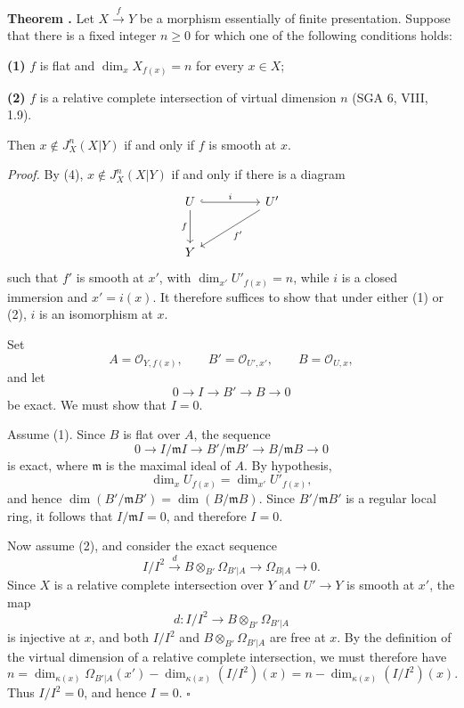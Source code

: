 \medskip
\noindent\textbf{Theorem .}
Let $X\xrightarrow{f}Y$ be a morphism essentially of finite
presentation. Suppose that there is a fixed integer $n\geq0$ for
which one of the following conditions holds:

\smallskip
\noindent\textbf{(1)} $f$ is flat and
$\dim_xX_{f(x)}=n$ for every $x\in X$;

\smallskip
\noindent\textbf{(2)} $f$ is a relative complete intersection of
virtual dimension $n$ (SGA 6, VIII, 1.9).

\smallskip
Then $x\notin J_X^n(X|Y)$ if and only if $f$ is smooth at $x$.

\smallskip
\noindent\textit{Proof.}
By (4), $x\notin J_X^n(X|Y)$ if and only if there is a diagram
\[
\begin{tikzcd}[column sep=huge,row sep=large]
U \arrow[r,hook,"i"] \arrow[d,"f"']
  & U' \arrow[dl,"f'"] \\
Y & {}
\end{tikzcd}
\]
such that $f'$ is smooth at $x'$, with
$\dim_{x'}U'_{f(x)}=n$, while $i$ is a closed immersion and
$x'=i(x)$. It therefore suffices to show that under either (1) or
(2), $i$ is an isomorphism at $x$.

Set
\[
A=\mathcal O_{Y,f(x)},\qquad
B'=\mathcal O_{U',x'},\qquad B=\mathcal O_{U,x},
\]
and let
\[
0\longrightarrow I\longrightarrow B'\longrightarrow B
\longrightarrow0
\]
be exact. We must show that $I=0$.

Assume (1). Since $B$ is flat over $A$, the sequence
\[
0\longrightarrow I/\mathfrak mI
\longrightarrow B'/\mathfrak mB'
\longrightarrow B/\mathfrak mB\longrightarrow0
\]
is exact, where $\mathfrak m$ is the maximal ideal of $A$. By
hypothesis,
\[
\dim_xU_{f(x)}=\dim_{x'}U'_{f(x)},
\]
and hence
$\dim(B'/\mathfrak mB')=\dim(B/\mathfrak mB)$. Since
$B'/\mathfrak mB'$ is a regular local ring, it follows that
$I/\mathfrak mI=0$, and therefore $I=0$.


Now assume (2), and consider the exact sequence
\[
I/I^2\xrightarrow{d}B\otimes_{B'}\Omega_{B'|A}
\longrightarrow\Omega_{B|A}\longrightarrow0.
\]
Since $X$ is a relative complete intersection over $Y$ and
$U'\longrightarrow Y$ is smooth at $x'$, the map
\[
d:I/I^2\longrightarrow B\otimes_{B'}\Omega_{B'|A}
\]
is injective at $x$, and both $I/I^2$ and
$B\otimes_{B'}\Omega_{B'|A}$ are free at $x$. By the definition of
the virtual dimension of a relative complete intersection, we must
therefore have
\[
n=\dim_{\kappa(x)}\Omega_{B'|A}(x')
  -\dim_{\kappa(x)}(I/I^2)(x)
 =n-\dim_{\kappa(x)}(I/I^2)(x).
\]
Thus $I/I^2=0$, and hence $I=0$. \hfill$\square$

